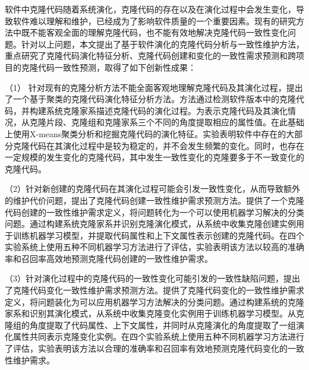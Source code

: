 



软件中克隆代码随着系统演化，克隆代码的存在以及在演化过程中会发生变化，导致软件难以理解和维护，已经成为了影响软件质量的一个重要因素。现有的研究方法中既不能客观全面的理解克隆代码，也不能有效地解决克隆代码一致性变化问题。针对以上问题，本文提出了基于软件演化的克隆代码分析与一致性维护方法，重点研究了克隆代码演化特征分析、克隆代码创建和变化的一致性需求预测和跨项目的克隆代码一致性预测，取得了如下创新性成果：

（1） 针对现有的克隆分析方法不能全面客观地理解克隆代码及其演化过程，提出了一个基于聚类的克隆代码演化特征分析方法。方法通过检测软件版本中的克隆代码，并构建系统克隆家系描述克隆代码的演化过程。为表示克隆代码及其演化情况，从克隆片段、克隆组和克隆家系三个不同的角度提取相应的属性值。在此基础上使用X-means聚类分析和挖掘克隆代码的演化特征。实验表明软件中存在的大部分克隆代码在其演化过程中是较为稳定的，并不会发生频繁的变化。同时，也存在一定规模的发生变化的克隆代码，其中发生一致性变化的克隆要多于不一致变化的克隆代码。

（2）针对新创建的克隆代码在其演化过程可能会引发一致性变化，从而导致额外的维护代价问题，提出了克隆代码创建一致性维护需求预测方法。提供了一个克隆代码创建的一致性维护需求定义，将问题转化为一个可以使用机器学习解决的分类问题。通过构建系统克隆家系并识别克隆演化模式，从系统中收集克隆创建实例用于训练机器学习模型，并提取代码属性和上下文属性表示创建的克隆代码。在四个实验系统上使用五种不同机器学习方法进行了评估，实验表明该方法以较高的准确率和召回率高效地预测克隆代码创建的一致性维护需求。

（3）针对演化过程中的克隆代码的一致性变化可能引发的一致性缺陷问题，提出了克隆代码变化一致性维护需求预测方法。提供了克隆代码变化的一致性维护需求定义，将问题装化为可以应用机器学习方法解决的分类问题。通过构建系统的克隆家系和识别其演化模式，从系统中收集克隆变化实例用于训练机器学习模型。从克隆组的角度提取了代码属性、上下文属性，并同时从克隆演化的角度提取了一组演化属性共同表示克隆变化实例。在四个实验系统上使用五种不同机器学习方法进行了评估，实验表明该方法以合理的准确率和召回率有效地预测克隆代码变化的一致性维护需求。

